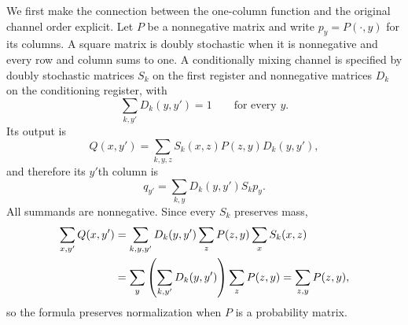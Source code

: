 \documentclass[aps,pra,11pt,onecolumn,nofootinbib,tightenlines]{revtex4-2}
\theoremstyle{definition}
\begin{document}
We first make the connection between the one-column function and the original
channel order explicit. Let $P$ be a nonnegative matrix and write
$p_y=P(\mathord\cdot,y)$ for its columns. A square matrix is doubly stochastic
when it is nonnegative and every row and column sums to one. A conditionally
mixing channel is specified by doubly stochastic matrices $S_k$ on the first register and
nonnegative matrices $D_k$ on the conditioning register, with
\begin{equation}
 \sum_{k,y'}D_k(y,y')=1
 \qquad\text{for every }y.
 \label{eq:channel-normalisation}
\end{equation}
Its output is
\begin{equation}
 Q(x,y')=\sum_{k,y,z}S_k(x,z)P(z,y)D_k(y,y'),
 \label{eq:conditional-channel-output}
\end{equation}
and therefore its $y'$th column is
\begin{equation}
 q_{y'}=\sum_{k,y}D_k(y,y')S_kp_y.
 \label{eq:output-column-decomposition}
\end{equation}
All summands are nonnegative. Since every $S_k$ preserves mass,
\begin{align}
 \sum_{x,y'}Q(x,y')
 &=\sum_{k,y,y'}D_k(y,y')\sum_zP(z,y)\sum_xS_k(x,z)\notag\\
 &=\sum_y\left(\sum_{k,y'}D_k(y,y')\right)\sum_zP(z,y)
 =\sum_{z,y}P(z,y),
 \label{eq:channel-mass-preservation}
\end{align}
so the formula preserves normalization when $P$ is a probability matrix.
\end{document}

